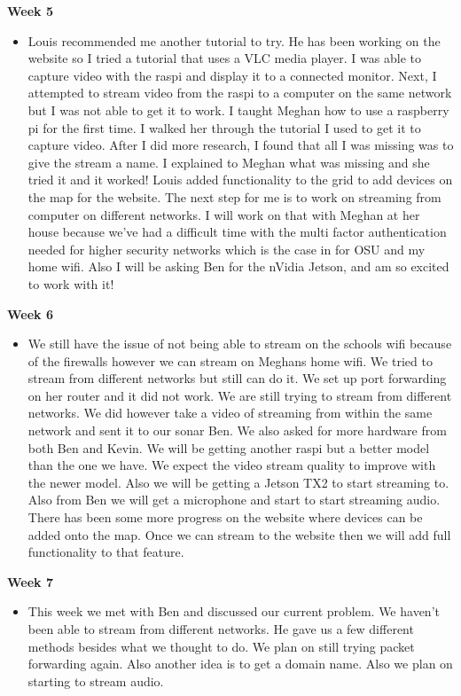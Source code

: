             \textbf{Week 5}
            \begin{itemize}
                \item Louis recommended me another tutorial to try. He has been working on the website so I tried a tutorial that uses a VLC media player. I was able to capture video with the raspi and display it to a connected monitor. Next, I attempted to stream video from the raspi to a computer on the same network but I was not able to get it to work.  I taught Meghan how to use a raspberry pi for the first time. I walked her through the tutorial I used to get it to capture video. After I did more research, I found that all I was missing was to give the stream a name. I explained to Meghan what was missing and she tried it and it worked! Louis added functionality to the grid to add devices on the map for the website. The next step for me is to work on streaming from computer on different networks. I will work on that with Meghan at her house because we've had a difficult time with the multi factor authentication needed for higher security networks which is the case in for OSU and my home wifi. Also I will be asking Ben for the nVidia Jetson, and am so excited to work with it!
            \end{itemize}
            
            \textbf{Week 6}
            \begin{itemize}
                \item We still have the issue of not being able to stream on the schools wifi because of the firewalls however we can stream on Meghans home wifi. We tried to stream from different networks but still can do it. We set up port forwarding on her router and it did not work. We are still trying to stream from different networks. We did however take a video of streaming from within the same network and sent it to our sonar Ben. We also asked for more hardware from both Ben and Kevin. We will be getting another raspi but a better model than the one we have. We expect the video stream quality to improve with the newer model. Also we will be getting a Jetson TX2 to start streaming to. Also from Ben we will get a microphone and start to start streaming audio. There has been some more progress on the website where devices can be added onto the map. Once we can stream to the website then we will add full functionality to that feature.
            \end{itemize}
            
            \textbf{Week 7}
            \begin{itemize}
                \item This week we met with Ben and discussed our current problem. We haven’t been able to stream from different networks. He gave us a few different methods besides what we thought to do. We plan on still trying packet forwarding again. Also another  idea is to get a domain name. Also we plan on starting to stream audio.  
            \end{itemize}
            
